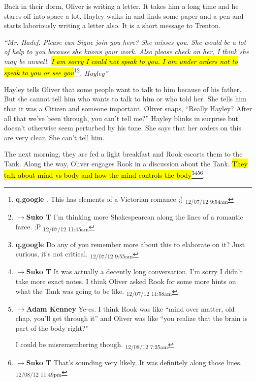 Back in their dorm, Oliver is writing a letter.  It takes him a long time and he stares off into space a lot.  Hayley walks in and finds some paper and a pen and starts laboriously writing a letter also.  It is a short message to Trenton.



\textit{``Mr. Hadef.  Please can Signe join you here?  She misses you. She would be a lot of help to you because she knows your work.  Also please check on her, I think she may be unwell.  }\textit{\hl{I am sorry I could not speak to you.  I am under orders not to speak to you or see you}}\footnote{\textbf{q.google }.  This has elements of a Victorian romance ;) \textsubscript{12/07/12 9:54am}}\footnote{$\rightarrow$\textbf{Suko T }I'm thinking more Shakespearean along the lines of a romantic farce. ;P \textsubscript{12/07/12 11:45am}}\textit{. Hayley''}



Hayley tells Oliver that some people want to talk to him because of his father.  But she cannot tell him who wants to talk to him or who told her.  She tells him that it was a Citizen and someone important.  Oliver snaps, ``Really Hayley?  After all that we've been through, you can't tell me?''  Hayley blinks in surprise but doesn't otherwise seem perturbed by his tone.  She  says that her orders on this are very clear.  She can't tell him.



The next morning, they are fed a light breakfast and Rook escorts them to the Tank.  Along the way, Oliver engages Rook in a discussion about the Tank.  \hl{They talk about mind vs body and how the mind controls the body}\footnote{\textbf{q.google }Do any of you remember more about this to elaborate on it?  Just curious, it's not critical. \textsubscript{12/07/12 9:55am}}\footnote{$\rightarrow$\textbf{Suko T }It was actually a decently long conversation.  I'm sorry I didn't take more exact notes.  I think Oliver asked Rook for some more hints on what the Tank was going to be like. \textsubscript{12/07/12 11:58am}}\footnote{$\rightarrow$\textbf{Adam Kenney }Ye-es.  I think Rook was like ``mind over matter, old chap, you'll get through it'' and Oliver was like ``you realize that the brain is part of the body right?''  

I could be misremembering though. \textsubscript{12/08/12 7:25am}}\footnote{$\rightarrow$\textbf{Suko T }That's sounding very likely.  It was definitely along those lines. \textsubscript{12/08/12 11:49pm}}. 



